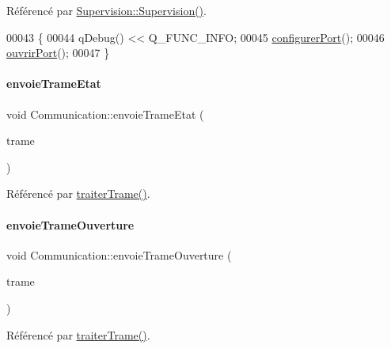 Référencé par \hyperlink{_supervision_8cpp_source_l00036}{Supervision\+::\+Supervision()}.


\begin{DoxyCode}
00043 \{
00044     qDebug() << Q\_FUNC\_INFO;
00045     \hyperlink{class_communication_ae39284eac0920a3d11c085b48c6234da}{configurerPort}();
00046     \hyperlink{class_communication_ad5969603a6b7232d0227a461fd479251}{ouvrirPort}();
00047 \}
\end{DoxyCode}
\mbox{\label{class_communication_a8beb7417ede75d0056b06788ef72d21b}} 
\paragraph{\texorpdfstring{envoie\+Trame\+Etat}{envoieTrameEtat}}
{\footnotesize\ttfamily void Communication\+::envoie\+Trame\+Etat (\begin{DoxyParamCaption}\item[{Q\+String}]{trame }\end{DoxyParamCaption})\hspace{0.3cm}{\ttfamily [signal]}}



Référencé par \hyperlink{_communication_8cpp_source_l00158}{traiter\+Trame()}.

\mbox{\label{class_communication_a9fb098f5b5cb8931efefc58984529119}} 
\paragraph{\texorpdfstring{envoie\+Trame\+Ouverture}{envoieTrameOuverture}}
{\footnotesize\ttfamily void Communication\+::envoie\+Trame\+Ouverture (\begin{DoxyParamCaption}\item[{Q\+String}]{trame }\end{DoxyParamCaption})\hspace{0.3cm}{\ttfamily [signal]}}



Référencé par \hyperlink{_communication_8cpp_source_l00158}{traiter\+Trame()}.

